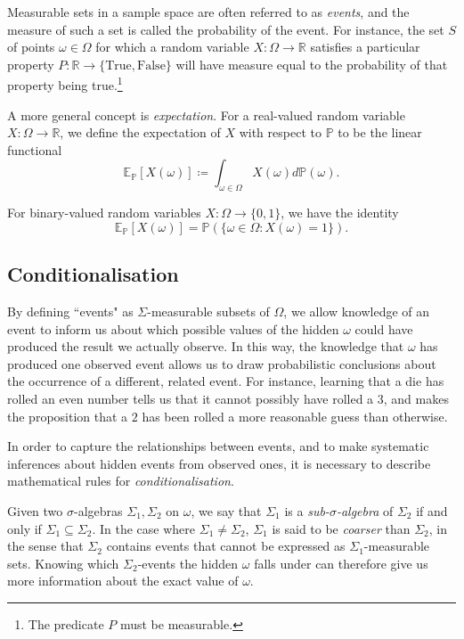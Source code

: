 \documentclass[honours,12pt]{unswthesis}
\numberwithin{equation}{section}
\begin{document}
Measurable sets in a sample space are often referred to as \textit{events}, and the measure of such a set is called the probability of the event. For instance, the set $S$ of points $\omega\in\Omega$ for which a random variable $X:\Omega\to\mathbb{R}$ satisfies a particular property $P:\mathbb{R}\to\{\mathrm{True},\mathrm{False}\}$ will have measure equal to the probability of that property being true.\footnote{The predicate $P$ must be measurable.}

A more general concept is \textit{expectation}. For a real-valued random variable $X:\Omega\to \mathbb{R}$, we define the expectation of $X$ with respect to $\mathbb{P}$ to be the linear functional
$$\mathbb{E}_{\mathbb{P}}[X(\omega)] \coloneq \int_{\omega\in\Omega} X(\omega)d\mathbb{P}(\omega).$$

For binary-valued random variables $X:\Omega\to\{0,1\}$, we have the identity
$$\mathbb{E}_\mathbb{P}[X(\omega)] = \mathbb{P}\left(\{\omega\in\Omega : X(\omega)=1\}\right).$$

\subsection{Conditionalisation}
By defining ``events" as $\Sigma$-measurable subsets of $\Omega$, we allow knowledge of an event to inform us about which possible values of the hidden $\omega$ could have produced the result we actually observe. In this way, the knowledge that $\omega$ has produced one observed event allows us to draw probabilistic conclusions about the occurrence of a different, related event. For instance, learning that a die has rolled an even number tells us that it cannot possibly have rolled a $3$, and makes the proposition that a $2$ has been rolled a more reasonable guess than otherwise.

In order to capture the relationships between events, and to make systematic inferences about hidden events from observed ones, it is necessary to describe mathematical rules for \textit{conditionalisation}.

Given two $\sigma$-algebras $\Sigma_1,\Sigma_2$ on $\omega$, we say that $\Sigma_1$ is a \textit{sub-$\sigma$-algebra} of $\Sigma_2$ if and only if $\Sigma_1\subseteq\Sigma_2$. In the case where $\Sigma_1\not=\Sigma_2$, $\Sigma_1$ is said to be \textit{coarser} than $\Sigma_2$, in the sense that $\Sigma_2$ contains events that cannot be expressed as $\Sigma_1$-measurable sets. Knowing which $\Sigma_2$-events the hidden $\omega$ falls under can therefore give us more information about the exact value of $\omega$.
\end{document}
